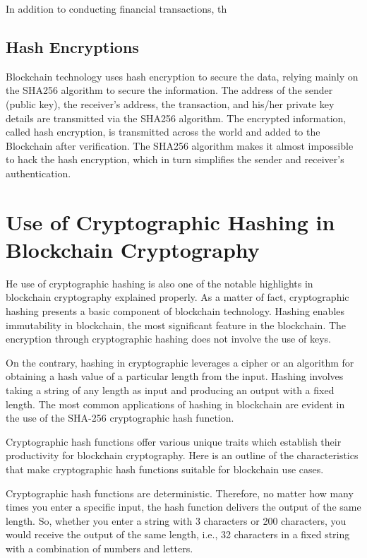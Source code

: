 \documentclass[BTech]{srmuthesis}
\begin{document}
  In addition to conducting financial transactions, th

  \subsection{Hash Encryptions} Blockchain technology uses hash encryption to secure the data, relying mainly on the SHA256 algorithm to secure the information. The address of the sender (public key), the receiver’s address, the transaction, and his/her private key details are transmitted via the SHA256 algorithm. The encrypted information, called hash encryption, is transmitted across the world and added to the Blockchain after verification. The SHA256 algorithm makes it almost impossible to hack the hash encryption, which in turn simplifies the sender and receiver’s authentication.

  \section{Use of Cryptographic Hashing in Blockchain Cryptography }
  He use of cryptographic hashing is also one of the notable highlights in blockchain cryptography explained properly. As a matter of fact, cryptographic hashing presents a basic component of blockchain technology. Hashing enables immutability in blockchain, the most significant feature in the blockchain. The encryption through cryptographic hashing does not involve the use of keys. 

  On the contrary, hashing in cryptographic leverages a cipher or an algorithm for obtaining a hash value of a particular length from the input. Hashing involves taking a string of any length as input and producing an output with a fixed length. The most common applications of hashing in blockchain are evident in the use of the SHA-256 cryptographic hash function.

  Cryptographic hash functions offer various unique traits which establish their productivity for blockchain cryptography. Here is an outline of the characteristics that make cryptographic hash functions suitable for blockchain use cases.

  Cryptographic hash functions are deterministic. Therefore, no matter how many times you enter a specific input, the hash function delivers the output of the same length. So, whether you enter a string with 3 characters or 200 characters, you would receive the output of the same length, i.e., 32 characters in a fixed string with a combination of numbers and letters. 
\end{document}
